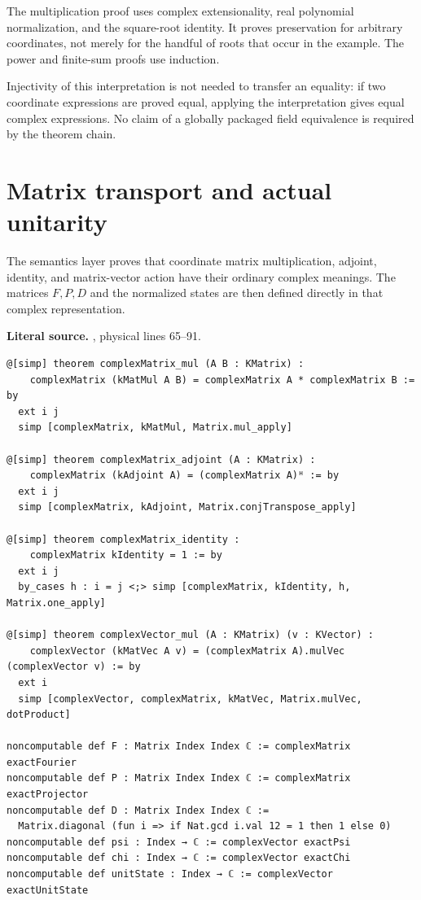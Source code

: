 The multiplication proof uses complex extensionality, real polynomial
normalization, and the square-root identity. It proves preservation for arbitrary
coordinates, not merely for the handful of roots that occur in the example.
The power and finite-sum proofs use induction.

Injectivity of this interpretation is not needed to transfer an equality: if
two coordinate expressions are proved equal, applying the interpretation gives
equal complex expressions. No claim of a globally packaged field equivalence is
required by the theorem chain.

\section{Matrix transport and actual unitarity}
The semantics layer proves that coordinate matrix multiplication, adjoint,
identity, and matrix-vector action have their ordinary complex meanings.
The matrices \(F,P,D\) and the normalized states are then defined directly
in that complex representation.

\noindent\textbf{Literal source.} \texttt{}, physical lines 65--91.

\begin{Verbatim}[breaklines=true,breakanywhere=true,fontsize=\footnotesize]
@[simp] theorem complexMatrix_mul (A B : KMatrix) :
    complexMatrix (kMatMul A B) = complexMatrix A * complexMatrix B := by
  ext i j
  simp [complexMatrix, kMatMul, Matrix.mul_apply]

@[simp] theorem complexMatrix_adjoint (A : KMatrix) :
    complexMatrix (kAdjoint A) = (complexMatrix A)ᴴ := by
  ext i j
  simp [complexMatrix, kAdjoint, Matrix.conjTranspose_apply]

@[simp] theorem complexMatrix_identity :
    complexMatrix kIdentity = 1 := by
  ext i j
  by_cases h : i = j <;> simp [complexMatrix, kIdentity, h, Matrix.one_apply]

@[simp] theorem complexVector_mul (A : KMatrix) (v : KVector) :
    complexVector (kMatVec A v) = (complexMatrix A).mulVec (complexVector v) := by
  ext i
  simp [complexVector, complexMatrix, kMatVec, Matrix.mulVec, dotProduct]

noncomputable def F : Matrix Index Index ℂ := complexMatrix exactFourier
noncomputable def P : Matrix Index Index ℂ := complexMatrix exactProjector
noncomputable def D : Matrix Index Index ℂ :=
  Matrix.diagonal (fun i => if Nat.gcd i.val 12 = 1 then 1 else 0)
noncomputable def psi : Index → ℂ := complexVector exactPsi
noncomputable def chi : Index → ℂ := complexVector exactChi
noncomputable def unitState : Index → ℂ := complexVector exactUnitState
\end{Verbatim}

